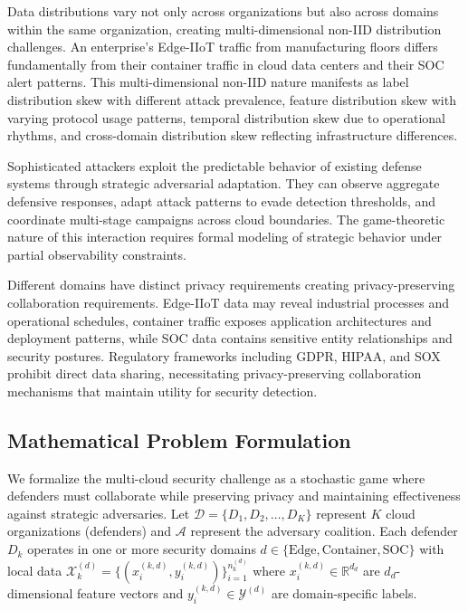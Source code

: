 \documentclass[12pt,a4paper]{article}
\theoremstyle{definition}
\begin{document}
Data distributions vary not only across organizations but also across domains within the same organization, creating multi-dimensional non-IID distribution challenges. An enterprise's Edge-IIoT traffic from manufacturing floors differs fundamentally from their container traffic in cloud data centers and their SOC alert patterns. This multi-dimensional non-IID nature manifests as label distribution skew with different attack prevalence, feature distribution skew with varying protocol usage patterns, temporal distribution skew due to operational rhythms, and cross-domain distribution skew reflecting infrastructure differences.

Sophisticated attackers exploit the predictable behavior of existing defense systems through strategic adversarial adaptation. They can observe aggregate defensive responses, adapt attack patterns to evade detection thresholds, and coordinate multi-stage campaigns across cloud boundaries. The game-theoretic nature of this interaction requires formal modeling of strategic behavior under partial observability constraints.

Different domains have distinct privacy requirements creating privacy-preserving collaboration requirements. Edge-IIoT data may reveal industrial processes and operational schedules, container traffic exposes application architectures and deployment patterns, while SOC data contains sensitive entity relationships and security postures. Regulatory frameworks including GDPR, HIPAA, and SOX prohibit direct data sharing, necessitating privacy-preserving collaboration mechanisms that maintain utility for security detection.

\subsection{Mathematical Problem Formulation}

We formalize the multi-cloud security challenge as a stochastic game where defenders must collaborate while preserving privacy and maintaining effectiveness against strategic adversaries. Let $\mathcal{D} = \{D_1, D_2, \ldots, D_K\}$ represent $K$ cloud organizations (defenders) and $\mathcal{A}$ represent the adversary coalition. Each defender $D_k$ operates in one or more security domains $d \in \{\text{Edge}, \text{Container}, \text{SOC}\}$ with local data $\mathcal{X}_k^{(d)} = \{(x_i^{(k,d)}, y_i^{(k,d)})\}_{i=1}^{n_k^{(d)}}$ where $x_i^{(k,d)} \in \mathbb{R}^{d_d}$ are $d_d$-dimensional feature vectors and $y_i^{(k,d)} \in \mathcal{Y}^{(d)}$ are domain-specific labels.
\end{document}
